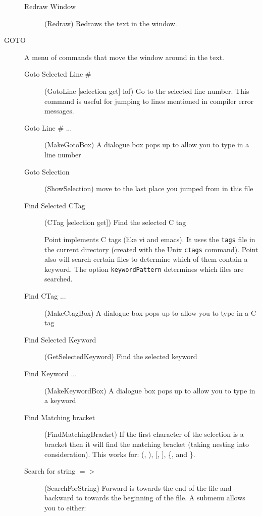 \begin{description}
\begin{description}
	\item[Redraw Window] (Redraw)
	Redraws the text in the window.

	\end{description}

\item[GOTO] A menu of commands that move the window around in the text.

	\begin{description}

	\item[Goto Selected Line \#] (GotoLine [selection get] lof)
		Go to the selected line number.  This command is useful
		for jumping to lines mentioned in compiler error
		messages.

	\item[Goto Line \# ...] (MakeGotoBox) A dialogue box pops up
		to allow you to type in a line number

	\item[Goto Selection] (ShowSelection) move to the last place
		you jumped from in this file

	\item[Find Selected CTag] (CTag [selection get])
		Find the selected C tag

	Point implements C tags (like vi and emacs).
	It uses the {\tt tags} file in the current directory
	(created with the Unix {\tt ctags} command).
	Point also will search certain files to determine which of them
	contain a keyword.
	The option {\tt keywordPattern} determines which files are searched.

	\item[Find CTag ...] (MakeCtagBox) A dialogue box pops up
		to allow you to type in a C tag

	\item[Find Selected Keyword] (GetSelectedKeyword)
		Find the selected keyword

	\item[Find Keyword ...] (MakeKeywordBox)
		A dialogue box pops up to allow you to
		type in a keyword

	\item[Find Matching bracket] (FindMatchingBracket)
		If the first character of the
		selection is a bracket then it will find the
		matching bracket (taking nesting into consideration).
		This works for: (, ), [, ], \{, and \}.
			
	\item[Search for string $=>$] (SearchForString)
	Forward is towards the end of the file and backward to towards
	the beginning of the file.
	A submenu allows you to either:


\end{description}
\end{description}
